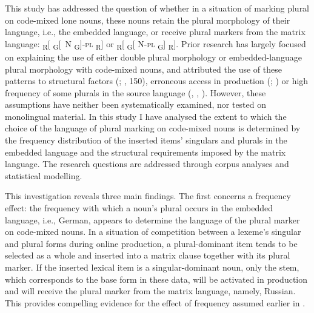 \noindent This study has addressed the question of whether in a situation of marking plural on code-mixed lone nouns, these nouns retain the plural morphology of their language, i.e., the embedded language, or receive plural markers from the matrix language: {\textsubscript{R}[ \textsubscript{G}[~N \textsubscript{G}]-\textsc{pl} \textsubscript{R}]} or {\textsubscript{R}[ \textsubscript{G}[ N-\textsc{pl} \textsubscript{G}] \textsubscript{R}]}. Prior research has largely focused on explaining the use of either double plural morphology or embedded-language plural morphology with code-mixed nouns, and attributed the use of these patterns to structural factors (\citealt[91]{boumans-syntax-1998}; \citealt[91]{myers-scotton-contact-2002}, 150), erroneous access in production (\citealt[132--136]{myers-scotton-duelling-1993}; \citealt[1000]{myers-scotton-matching-1995}) or high frequency of some plurals in the source language (\citealt[151]{backus-two-1996}, \citeyear[97--99]{backus-evidence-1999}, \citeyear[93--100]{backus-units-2003}). However, these assumptions have neither been systematically examined, nor tested on monolingual material. In this study I have analysed the extent to which the choice of the language of plural marking on code-mixed nouns is determined by the frequency distribution of the inserted items’ singulars and plurals in the embedded language and the structural requirements imposed by the matrix language. The research questions are addressed through corpus analyses and statistical modelling.

This investigation reveals three main findings. The first concerns a frequency effect: the frequency with which a noun’s plural occurs in the embedded language, i.e., German, appears to determine the language of the plural marker on code-mixed nouns. In a situation of competition between a lexeme’s singular and plural forms during online production, a plural-dominant item tends to be selected as a whole and inserted into a matrix clause together with its plural marker. If the inserted lexical item is a singular-dominant noun, only the stem, which corresponds to the base form in these data, will be activated in production and will receive the plural marker from the matrix language, namely, Russian. This provides compelling evidence for the effect of frequency assumed earlier in \citep{backus-two-1996,backus-evidence-1999, backus-units-2003}.


